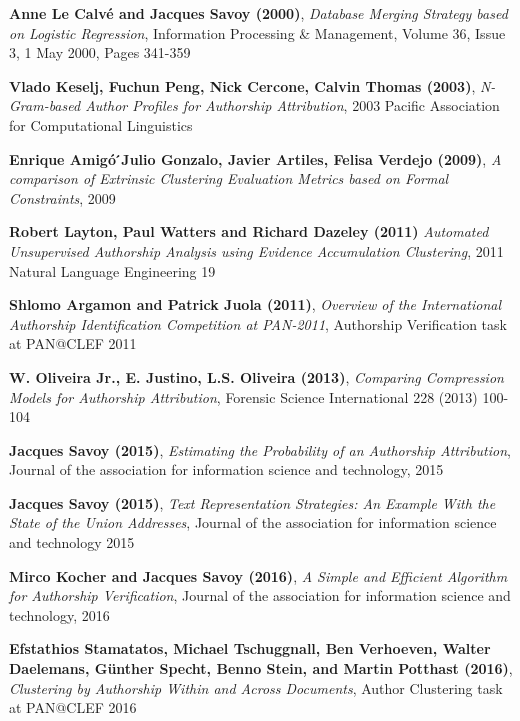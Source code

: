 \begin{thebibliography}{9}

\textbf{Anne Le Calvé and Jacques Savoy (2000)},
\textit{Database Merging Strategy based on Logistic Regression},
Information Processing \& Management, Volume 36, Issue 3, 1 May 2000, Pages 341-359

\textbf{Vlado Keselj, Fuchun Peng, Nick Cercone, Calvin Thomas (2003)},
\textit{N-Gram-based Author Profiles for Authorship Attribution},
2003 Pacific Association for Computational Linguistics

\textbf{Enrique Amigó ́Julio Gonzalo, Javier Artiles, Felisa Verdejo (2009)},
\textit{A comparison of Extrinsic Clustering Evaluation Metrics based on Formal Constraints},
2009

\textbf{Robert Layton, Paul Watters and Richard Dazeley (2011)}
\textit{Automated Unsupervised Authorship Analysis using Evidence Accumulation Clustering},
2011 Natural Language Engineering 19

\textbf{Shlomo Argamon and Patrick Juola (2011)},
\textit{Overview of the International Authorship Identification Competition at PAN-2011},
Authorship Verification task at PAN@CLEF 2011

\textbf{W. Oliveira Jr., E. Justino, L.S. Oliveira (2013)},
\textit{Comparing Compression Models for Authorship Attribution},
Forensic Science International 228 (2013) 100-104

\textbf{Jacques Savoy (2015)},
\textit{Estimating the Probability of an Authorship Attribution},
Journal of the association for information science and technology, 2015

\textbf{Jacques Savoy (2015)},
\textit{Text Representation Strategies: An Example With the State of the Union Addresses},
Journal of the association for information science and technology 2015

\textbf{Mirco Kocher and Jacques Savoy (2016)},
\textit{A Simple and Efficient Algorithm for Authorship Verification},
Journal of the association for information science and technology, 2016

\textbf{Efstathios Stamatatos, Michael Tschuggnall, Ben Verhoeven, Walter Daelemans, Günther Specht, Benno Stein, and Martin Potthast (2016)},
\textit{Clustering by Authorship Within and Across Documents},
Author Clustering task at PAN@CLEF 2016


\end{thebibliography}
